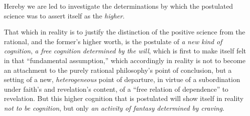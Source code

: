 \documentclass[12pt,a4paper]{book}
\begin{document}
Hereby we are led to investigate the determinations by which the postulated science was to
assert itself as the \emph{higher}.

That which in reality is to justify the distinction of the positive science from the rational,
and the former's higher worth, is the postulate of \emph{a new kind of cognition}, \emph{a free} \emph{cognition
determined by the will}, which is first to make itself felt in that ``fundamental assumption,''
which accordingly in reality is not to become an attachment to the purely rational philosophy's
point of conclusion, but a setting of a new, \emph{heterogeneous} point of departure, in virtue of a
subordination under faith's and revelation's content, of a ``free relation of dependence'' to
revelation. But this higher cognition that is postulated will show itself in reality \emph{not to be
cognition}, but only \emph{an activity of fantasy determined by craving}.
\end{document}
